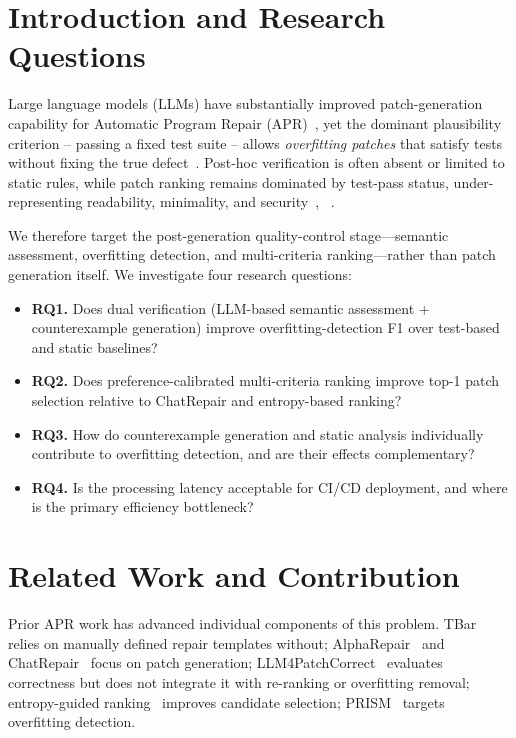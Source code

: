 \documentclass[conference]{IEEEtran}
\begin{document}
\section{Introduction and Research Questions}
Large language models (LLMs) have substantially improved patch-generation capability for Automatic Program Repair (APR)~\cite{lee2024survey}, yet the dominant plausibility criterion -- passing a fixed test suite -- allows \emph{overfitting patches} that satisfy tests without fixing the true defect~\cite{zhang2023llm4patchcorrect,wang2024entropy,zhao2025prism}. Post-hoc verification is often absent or limited to static rules, while patch ranking remains dominated by test-pass status, under-representing readability, minimality, and security~\cite{wang2024entropy}, ~\cite{zhang2023llm4patchcorrect}. 

We therefore target the post-generation quality-control stage—semantic assessment, overfitting detection, and multi-criteria ranking—rather than patch generation itself. We investigate four research questions:
\begin{itemize}
\item \textbf{RQ1.} Does dual verification (LLM-based semantic assessment + counterexample generation) improve overfitting-detection F1 over test-based and static baselines?
\item \textbf{RQ2.} Does preference-calibrated multi-criteria ranking improve top-1 patch selection relative to ChatRepair and entropy-based ranking?
\item \textbf{RQ3.} How do counterexample generation and static analysis individually contribute to overfitting detection, and are their effects complementary?
\item \textbf{RQ4.} Is the processing latency acceptable for CI/CD deployment, and where is the primary efficiency bottleneck?
\end{itemize}

\section{Related Work and Contribution}
Prior APR work has advanced individual components of this problem. TBar~\cite{liu2019tbar} relies on manually defined repair templates without; AlphaRepair~\cite{xia2022alpharepair} and ChatRepair~\cite{xia2023chatrepair} focus on patch generation; LLM4PatchCorrect~\cite{zhang2023llm4patchcorrect} evaluates correctness but does not integrate it with re-ranking or overfitting removal; entropy-guided ranking~\cite{wang2024entropy} improves candidate selection; PRISM~\cite{zhao2025prism} targets overfitting detection. 
\end{document}
